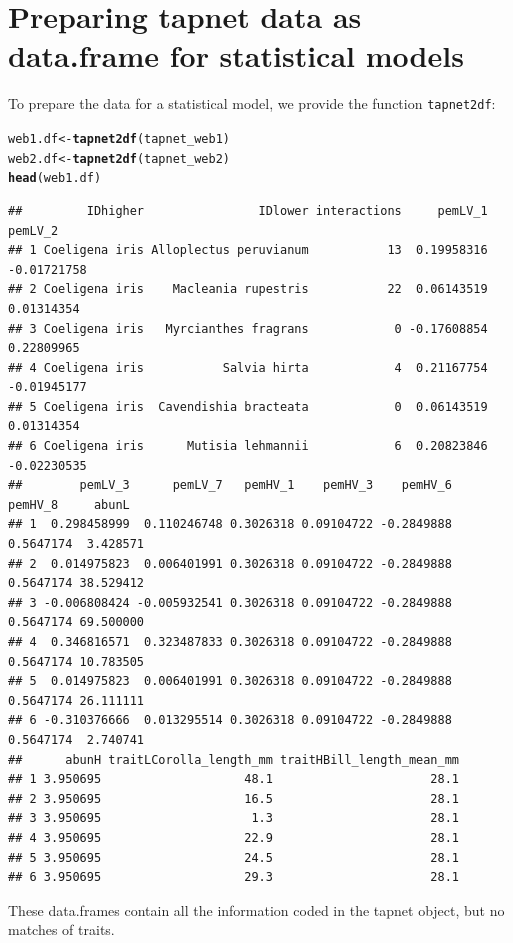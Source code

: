 \documentclass[a4paper, 11pt]{article}\usepackage[]{graphicx}\usepackage[]{color}
\makeatletter
\newcommand{\hlstd}[1]{\textcolor[rgb]{0.345,0.345,0.345}{#1}}%
\newcommand{\hlkwb}[1]{\textcolor[rgb]{0.69,0.353,0.396}{#1}}%
\newcommand{\hlkwd}[1]{\textcolor[rgb]{0.737,0.353,0.396}{\textbf{#1}}}%
\newenvironment{kframe}{%
 \def\at@end@of@kframe{}%
 \ifinner\ifhmode%
  \def\at@end@of@kframe{\end{minipage}}%
  \begin{minipage}{\columnwidth}%
 \fi\fi%
 \def\FrameCommand##1{\hskip\@totalleftmargin \hskip-\fboxsep
 \colorbox{shadecolor}{##1}\hskip-\fboxsep
     \hskip-\linewidth \hskip-\@totalleftmargin \hskip\columnwidth}%
 \MakeFramed {\advance\hsize-\width
   \@totalleftmargin\z@ \linewidth\hsize
   \@setminipage}}%
 {\par\unskip\endMakeFramed%
 \at@end@of@kframe}
\newenvironment{knitrout}{}{} %
\newcommand{\code}[1]{\texttt{#1}}
\makeatother
\begin{document}
\section{Preparing tapnet data as data.frame for statistical models}
To prepare the data for a statistical model, we provide the function \code{tapnet2df}:
\begin{knitrout}\small
{}\color{fgcolor}\begin{kframe}
\begin{alltt}
\hlstd{web1.df} \hlkwb{<-} \hlkwd{tapnet2df}\hlstd{(tapnet_web1)}
\hlstd{web2.df} \hlkwb{<-} \hlkwd{tapnet2df}\hlstd{(tapnet_web2)}
\hlkwd{head}\hlstd{(web1.df)}
\end{alltt}
\begin{verbatim}
##         IDhigher                IDlower interactions     pemLV_1     pemLV_2
## 1 Coeligena iris Alloplectus peruvianum           13  0.19958316 -0.01721758
## 2 Coeligena iris    Macleania rupestris           22  0.06143519  0.01314354
## 3 Coeligena iris   Myrcianthes fragrans            0 -0.17608854  0.22809965
## 4 Coeligena iris           Salvia hirta            4  0.21167754 -0.01945177
## 5 Coeligena iris  Cavendishia bracteata            0  0.06143519  0.01314354
## 6 Coeligena iris      Mutisia lehmannii            6  0.20823846 -0.02230535
##        pemLV_3      pemLV_7   pemHV_1    pemHV_3    pemHV_6   pemHV_8     abunL
## 1  0.298458999  0.110246748 0.3026318 0.09104722 -0.2849888 0.5647174  3.428571
## 2  0.014975823  0.006401991 0.3026318 0.09104722 -0.2849888 0.5647174 38.529412
## 3 -0.006808424 -0.005932541 0.3026318 0.09104722 -0.2849888 0.5647174 69.500000
## 4  0.346816571  0.323487833 0.3026318 0.09104722 -0.2849888 0.5647174 10.783505
## 5  0.014975823  0.006401991 0.3026318 0.09104722 -0.2849888 0.5647174 26.111111
## 6 -0.310376666  0.013295514 0.3026318 0.09104722 -0.2849888 0.5647174  2.740741
##      abunH traitLCorolla_length_mm traitHBill_length_mean_mm
## 1 3.950695                    48.1                      28.1
## 2 3.950695                    16.5                      28.1
## 3 3.950695                     1.3                      28.1
## 4 3.950695                    22.9                      28.1
## 5 3.950695                    24.5                      28.1
## 6 3.950695                    29.3                      28.1
\end{verbatim}
\end{kframe}
\end{knitrout}
These data.frames contain all the information coded in the tapnet object, but no matches of traits.
\end{document}
